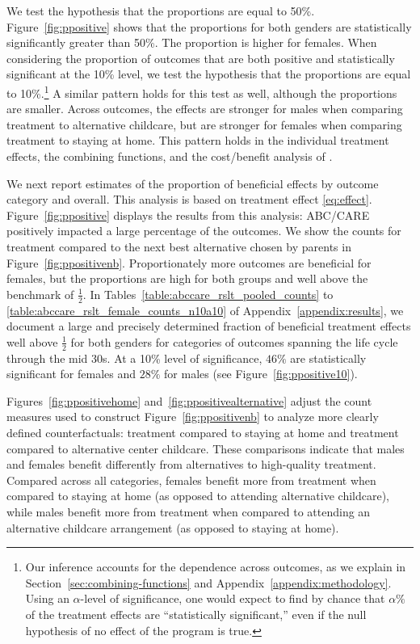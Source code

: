 We test the hypothesis that the proportions are equal to 50\%. Figure~\ref{fig:ppositive} shows that the proportions for both genders are statistically significantly greater than 50\%. The proportion is higher for females. When considering the proportion of outcomes that are both positive and statistically significant at the 10\% level, we test the hypothesis that the proportions are equal to 10\%.\footnote{Our inference accounts for the dependence across outcomes, as we explain in Section~\ref{sec:combining-functions} and Appendix~\ref{appendix:methodology}. Using an $\alpha$-level of significance, one would expect to find by chance that $\alpha\%$ of the treatment effects are ``statistically significant,'' even if the null hypothesis of no effect of the program is true.} A similar pattern holds for this test as well, although the proportions are smaller. Across outcomes, the effects are stronger for males when comparing treatment to alternative childcare, but are stronger for females when comparing treatment to staying at home. This pattern holds in the individual treatment effects, the combining functions, and the cost/benefit analysis of \citet{Garcia_Heckman_Leaf_etal_2017_Comp_CBA_Unpublished}.

We next report estimates of the proportion of beneficial effects by outcome category and overall. This analysis is based on treatment effect \eqref{eq:effect}. Figure~\ref{fig:ppositive} displays the results from this analysis: ABC/CARE positively impacted a large percentage of the outcomes. We show the counts for treatment compared to the next best alternative chosen by parents in Figure~\ref{fig:ppositivenb}. Proportionately more outcomes are beneficial for females, but the proportions are high for both groups and well above the benchmark of $\frac{1}{2}$. In Tables~\ref{table:abccare_rslt_pooled_counts} to \ref{table:abccare_rslt_female_counts_n10a10} of Appendix~\ref{appendix:results}, we document a large and precisely determined fraction of beneficial treatment effects well above $\frac{1}{2}$ for both genders for categories of outcomes spanning the life cycle through the mid 30s. At a 10\% level of significance, $46\%$ are statistically significant for females and $28\%$ for males (see Figure~\ref{fig:ppositive10}).

Figures~\ref{fig:ppositivehome} and~\ref{fig:ppositivealternative} adjust the count measures used to construct Figure~\ref{fig:ppositivenb} to analyze more clearly defined counterfactuals: treatment compared to staying at home and treatment compared to alternative center childcare. These comparisons indicate that males and females benefit differently from alternatives to high-quality treatment. Compared across all categories, females benefit more from treatment when compared to staying at home (as opposed to attending alternative childcare), while males benefit more from treatment when compared to attending an alternative childcare arrangement (as opposed to staying at home).

